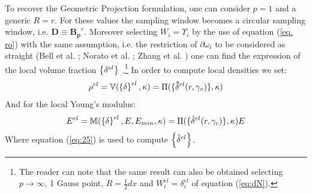  To recover the Geometric Projection formulation, one can consider $p=1$ and a generic $R=r$. For these values the sampling window becomes a circular sampling window, i.e. $\mathbf{D}\equiv\mathbf{B_p}^r$. Moreover selecting $W_i=\Upsilon_i$ by the use of equation (\ref{eq. ro}) with the same assumption, i.e. the restriction of $\partial \omega_i$ to be considered as straight (Bell et al. \cite{bell2012geometry}; Norato et al. \cite{norato2015geometry}; Zhang et al. \cite{zhang2016geometry}) one can find the expression of the local volume fraction $\left\{{\delta^{el}}\right\}$ .\footnote{The reader can note that the same result can also be obtained selecting $p\to \infty$, 1 Gauss point, $R=\frac{1}{2}dx$ and $W_i^{el}={\delta}_i^{el}$ of equation (\ref{eq:dN}). } In order to compute local densities we set:
  \begin{equation}
     \rho^{el}=\mathbb{V}(\left\{{\delta}\right\}^{el},\kappa)=\Pi(\lbrace\mathbf{\hat{\delta}}^{el}( r,\gamma_v )\rbrace,\kappa) 
 \end{equation}
 And for the local Young's modulus:
  \begin{equation}
 E^{el}=\mathbb{M}(\left\{{\delta}\right\}^{el},E,E_{min},\kappa)=\Pi(\lbrace{\hat{\delta}}^{el}(r,\gamma_c )\rbrace,\kappa) E
  \end{equation}
  Where equation (\ref{eq:25}) is used to compute $\left\{{\hat{\delta}^{el}}\right\}$.
 
